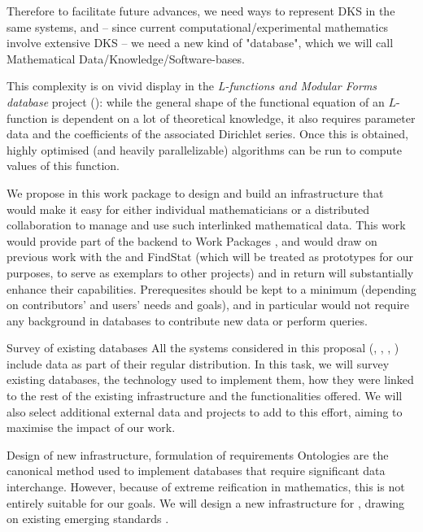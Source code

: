 \begin{Workpackage}{\thewpno}
\begin{WPDescription}

Therefore to facilitate future advances, we need ways to represent DKS in the same systems, and -- since current computational/experimental mathematics involve extensive DKS -- we need a new kind of "database", which we will call Mathematical Data/Knowledge/Software-bases.

This complexity is on vivid display in the \emph{L-functions and Modular Forms database} project (\LMFDB): while the general shape of the functional equation of an $L$-function is dependent on a lot of theoretical knowledge, it also requires parameter data and the coefficients of the associated Dirichlet series. Once this is obtained, highly optimised (and heavily parallelizable) algorithms can be run to compute values of this function. 

We propose in this work package to design and build an infrastructure that would make it easy for either individual mathematicians or a distributed collaboration to manage and use such interlinked mathematical data. This work would provide part of the backend to Work Packages , and would draw on previous work with the \LMFDB and FindStat (which will be treated as prototypes for our purposes, to serve as exemplars to other projects) and in return will substantially enhance their capabilities. Prerequesites should be kept to a minimum (depending on contributors' and users' needs and goals), and in particular would not require any background in databases to contribute new data or perform queries. 
\end{WPDescription}

\begin{task}{Survey of existing databases}
\label{task:data_assessment}
All the systems considered in this proposal (\GAP, \Sage, \Pari, \Singular) include data as part of their regular distribution. In this task, we will survey existing databases, the technology used to implement them, how they were linked to the rest of the existing infrastructure and the functionalities offered. We will also select additional external data and projects to add to this effort, aiming to maximise the impact of our work. 
\end{task}

\begin{task}{Design of new infrastructure, formulation of requirements}
\label{task:data_design}
Ontologies are the canonical method used to implement databases that require significant data interchange. However, because of extreme reification in mathematics, this is not entirely suitable for our goals. We will design a new infrastructure for \TheProject, drawing on existing emerging standards . 


\end{task}
\end{Workpackage}
